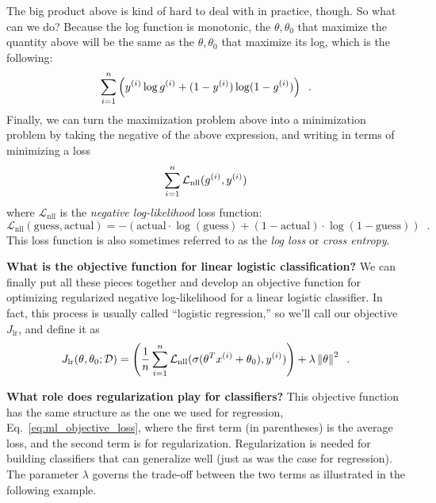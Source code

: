 The big product above is kind of hard to deal with in practice, though.
So what can we do?
Because the
log function is monotonic, the $\theta, \theta_0$ that maximize the
quantity above will be the same as the $\theta, \theta_0$ that
maximize its log, which is the following:
\begin{equation*}
  \sum_{i = 1}^n  \left( {y^{(i)}}\log {g^{(i)}} +
  (1 - y^{(i)})\log(1 - g^{(i)})\right)\;\;.
\end{equation*}
Finally, we can turn the maximization problem above into a minimization problem by taking the negative
of the above expression, and writing in terms of minimizing a loss
\begin{equation*}
  \sum_{i = 1}^n \mathcal{L}_\text{nll}(g^{(i)}, y^{(i)})
\end{equation*}
where $\mathcal{L}_\text{nll}$ is the {\em negative log-likelihood}
loss function:
\begin{equation*}
  \mathcal{L}_\text{nll}(\text{guess},\text{actual}) =
  -\left(\text{actual}\cdot \log (\text{guess}) + (1 - \text{actual})\cdot\log (1 -
  \text{guess})\right) \;\;.
\end{equation*}
This loss function is also sometimes referred to as the {\em log loss}
or {\em cross entropy}. 

{\bf What is the objective function for linear logistic classification?}
We can finally put all these pieces together and develop an objective
function for optimizing regularized negative log-likelihood for a
linear logistic classifier.   In
fact, this process is usually called ``logistic regression,'' so
we'll call our objective $J_\text{lr}$, and define it as
\begin{equation}
  J_\text{lr}(\theta, \theta_0; {\cal D}) =
  \left(\frac{1}{n} \sum_{i=1}^n
  \mathcal{L}_\text{nll}(\sigma(\theta^T x^{(i)} + \theta_0), y^{(i)})\right) +
  \lambda \left\lVert\theta\right\rVert^2\;\;.
  \label{eq:lr_with_reg}
\end{equation}


{\bf What role does regularization play for classifiers?}
This objective function has the same structure as the one we used for
regression, Eq.~\ref{eq:ml_objective_loss}, where the first term (in
parentheses) is the average loss, and the second term is for regularization.
Regularization is needed for building classifiers that can generalize
well (just as was the case for regression).  The parameter $\lambda$ governs
the trade-off between the two terms as illustrated in the following example.


